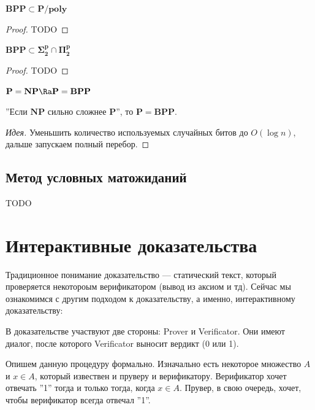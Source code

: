 \begin{theorem}[Эйдлмана]
    \(\mathbf{BPP} \subset \mathbf{P/poly}\)
\end{theorem}
\begin{proof}
    TODO
\end{proof}

\begin{theorem}
    \(\mathbf{BPP} \subset \mathbf{\Sigma_2^p} \cap \mathbf{\Pi_2^p}\)
\end{theorem}
\begin{proof}
    TODO
\end{proof}
\begin{corollary}
    \(\mathbf{P} = \mathbf{NP} \Ra \mathbf{P} = \mathbf{BPP}\)
\end{corollary}

\begin{theorem}
    ''Если \(\mathbf{NP}\) сильно сложнее \(\mathbf{P}\)'', то \(\mathbf{P} = \mathbf{BPP}\).
\end{theorem}
\begin{proof}[Идея]
    Уменьшить количество используемых случайных битов до \(O(\log n)\), дальше запускаем полный перебор.
\end{proof}

\subsection{Метод условных матожиданий}
TODO


\section{Интерактивные доказательства}

Традиционное понимание доказательство --- статический текст, который проверяется некотороым верификатором (вывод из аксиом и тд). Сейчас мы ознакомимся с другим подходом к доказательству, а именно, интерактивному доказательству:

В доказательстве участвуют две стороны: Prover и Verificator. Они имеют диалог, после которого Verificator выносит вердикт (0 или 1).

Опишем данную процедуру формально. Изначально есть некоторое множество \(A\) и \(x \in A\), который извествен и пруверу и верификатору. Верификатор хочет отвечать ''1'' тогда и только тогда, когда \(x \in A\). Прувер, в свою очередь, хочет, чтобы верификатор всегда отвечал ''1''.

